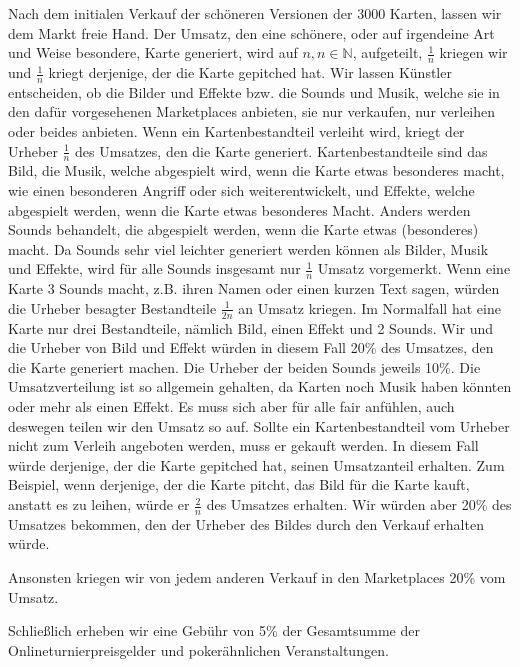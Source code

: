 \documentclass[fontsize=12, a4aper]{scrartcl}
\begin{document}
Nach dem initialen Verkauf der schöneren Versionen der 3000 Karten, lassen wir dem Markt freie Hand. Der Umsatz, den eine schönere, oder auf irgendeine Art und Weise besondere, Karte generiert, wird auf \(n, n \in \mathbb{N}\), aufgeteilt, \(\frac{1}{n}\) kriegen wir und \(\frac{1}{n}\) kriegt derjenige, der die Karte gepitched hat. Wir lassen Künstler entscheiden, ob die Bilder und Effekte bzw. die Sounds und Musik, welche sie in den dafür vorgesehenen Marketplaces anbieten, sie nur verkaufen, nur verleihen oder beides anbieten. Wenn ein Kartenbestandteil verleiht wird, kriegt der Urheber \(\frac{1}{n}\) des Umsatzes, den die Karte generiert. Kartenbestandteile sind das Bild, die Musik, welche abgespielt wird, wenn die Karte etwas besonderes macht, wie einen besonderen Angriff oder sich weiterentwickelt, und Effekte, welche abgespielt werden, wenn die Karte etwas besonderes Macht. Anders werden Sounds behandelt, die abgespielt werden, wenn die Karte etwas (besonderes) macht. Da Sounds sehr viel leichter generiert werden können als Bilder, Musik und Effekte, wird für alle Sounds insgesamt nur \(\frac{1}{n}\) Umsatz vorgemerkt. Wenn eine Karte 3 Sounds macht, z.B. ihren Namen oder einen kurzen Text sagen, würden die Urheber besagter Bestandteile \(\frac{1}{2n}\) an Umsatz kriegen. Im Normalfall hat eine Karte nur drei Bestandteile, nämlich Bild, einen Effekt und 2 Sounds. Wir und die Urheber von Bild und Effekt würden in diesem Fall 20\% des Umsatzes, den die Karte generiert machen. Die Urheber der beiden Sounds jeweils 10\%. Die Umsatzverteilung ist so allgemein gehalten, da Karten noch Musik haben könnten oder mehr als einen Effekt. Es muss sich aber für alle fair anfühlen, auch deswegen teilen wir den Umsatz so auf. Sollte ein Kartenbestandteil vom Urheber nicht zum Verleih angeboten werden, muss er gekauft werden. In diesem Fall würde derjenige, der die Karte gepitched hat, seinen Umsatzanteil erhalten. Zum Beispiel, wenn derjenige, der die Karte pitcht, das Bild für die Karte kauft, anstatt es zu leihen, würde er \(\frac{2}{n}\) des Umsatzes erhalten. Wir würden aber 20\% des Umsatzes bekommen, den der Urheber des Bildes durch den Verkauf erhalten würde.\hfill\newline

\noindent Ansonsten kriegen wir von jedem anderen Verkauf in den Marketplaces 20\% vom Umsatz.\hfill\newline

\noindent Schließlich erheben wir eine Gebühr von 5\% der Gesamtsumme der Onlineturnierpreisgelder und pokerähnlichen Veranstaltungen.
\end{document}
